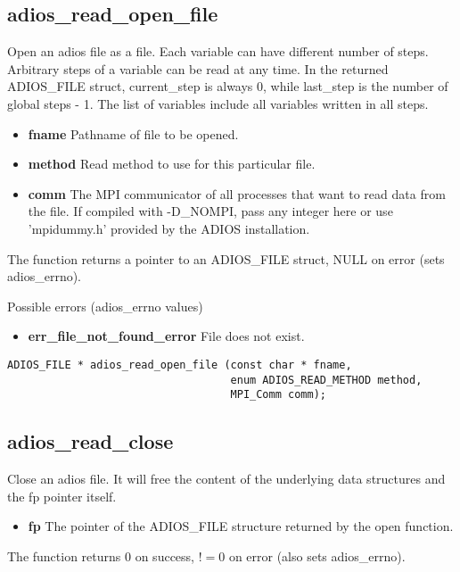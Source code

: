 \subsection{adios\_read\_open\_file}

Open an adios file as a file. Each variable can have different number of steps. Arbitrary steps of a variable
can be read at any time.  In the returned ADIOS\_FILE struct, current\_step is always 0, while last\_step is the number of global steps - 1. The list of variables include all variables written in all steps. 

\begin{itemize}
\item{\bf fname}    Pathname of file to be opened.
\item{\bf method}   Read method to use for this particular file.
\item{\bf comm}     The MPI communicator of all processes that want to read data from the file. If compiled with -D\_NOMPI, pass any integer here or use 'mpidummy.h' provided by the ADIOS installation. 
\end{itemize}

The function returns a pointer to an ADIOS\_FILE struct, NULL on error (sets adios\_errno). 

Possible errors (adios\_errno values)
\begin{itemize}
\item{\bf err\_file\_not\_found\_error}  File does not exist. 
\end{itemize}

\begin{lstlisting}[alsolanguage=C]
ADIOS_FILE * adios_read_open_file (const char * fname, 
                                   enum ADIOS_READ_METHOD method,
                                   MPI_Comm comm);
\end{lstlisting}

\subsection{adios\_read\_close}
Close an adios file. It will free the content of the underlying data structures and the fp pointer itself.

\begin{itemize}
\item{\bf fp}    The pointer of the ADIOS\_FILE structure returned by the open function.
\end{itemize}

The function returns 0 on success, $!=0$ on error (also sets adios\_errno).

